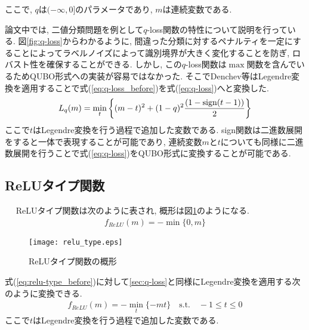 \documentclass{jarticle}
\begin{document}
ここで, $q$は$(-\infty,0]$のパラメータであり, $m$は連続変数である.
  
論文中では, 二値分類問題を例として$q$-loss関数の特性について説明を行っている. 図\ref{fig:q-loss}からわかるように, 間違った分類に対するペナルティを一定にすることによってラベルノイズによって識別境界が大きく変化することを防ぎ, ロバスト性を確保することができる. しかし, この$q$-loss関数は$\max$関数を含んでいるためQUBO形式への実装が容易ではなかった. そこでDenchev等はLegendre変換を適用することで式(\ref{eq:q-loss_before})を式(\ref{eq:q-loss})へと変換した.
\begin{equation}
  L_{q}(m)=\min_{t}{\left\{ (m-t)^{2}+(1-q)^{2}\frac{(1-\textrm{sign}(t-1))}{2}\right\} } \nonumber \\
  \label{eq:q-loss}
\end{equation}
ここで$t$はLegendre変換を行う過程で追加した変数である. sign関数は二進数展開をすると一体で表現することが可能であり, 連続変数$m$と$t$についても同様に二進数展開を行うことで式(\ref{eq:q-loss})をQUBO形式に変換することが可能である.
  
\subsection{ReLUタイプ関数}　\label{sec:ReLU}
ReLUタイプ関数\cite{bib:relu}は次のように表され, 概形は図\ref{fig:relu_type}のようになる.
\begin{eqnarray}
  f_{ReLU}(m)=-\min{\{0,m\} } \label{eq:relu-type_before}
\end{eqnarray}

\begin{figure}[htbp]
  \begin{center}
    \vspace{-1cm}
    \texttt{[image: relu\_type.eps]}
    \vspace{0.6cm}
    \caption{ReLUタイプ関数の概形}
    \label{fig:relu_type}
  \end{center}
\end{figure}

式(\ref{eq:relu-type_before})に対して\ref{sec:q-loss}と同様にLegendre変換を適用する次のように変換できる.
\begin{eqnarray}
  f_{ReLU}(m)=-\min_{t}{\{-mt\}} \quad \textrm{s.t.} \quad -1\leq t\leq 0 \label{eq:relu-type_after}
\end{eqnarray}
ここで$t$はLegendre変換を行う過程で追加した変数である.
\end{document}
